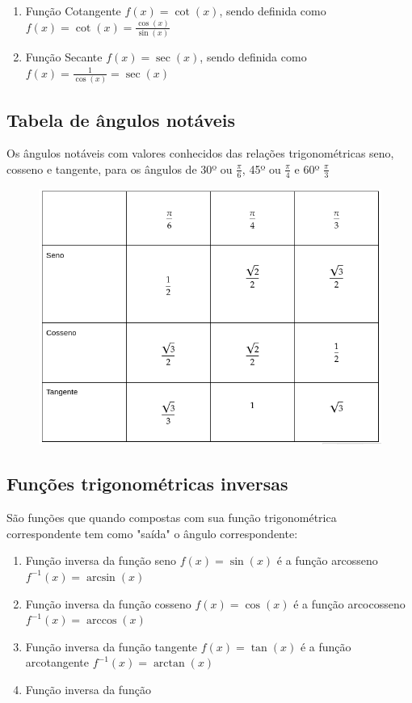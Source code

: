 \begin{multicols*}{2}
\begin{enumerate}[wide, labelwidth=!, labelindent=0pt]
        \item Função Cotangente $f(x) = \cot(x)$, sendo definida como
              $f(x) = \cot(x) = \frac{\cos(x)}{\sin(x)}$

        \item Função Secante $f(x) = \sec(x)$, sendo definida como
              $f(x) = \frac{1}{\cos(x)} = \sec(x)$

    \end{enumerate}
    \subsection*{Tabela de ângulos notáveis}
    Os ângulos notáveis com valores conhecidos das relações trigonométricas seno, cosseno e tangente, para os ângulos de 30º ou $\frac{\pi}{6}$, 45º ou $\frac{\pi}{4}$ e 60º $\frac{\pi}{3}$
    \begin{figure}[H]
        \centering
        \includegraphics[width=\columnwidth]{assets/rafael/img36.png}
    \end{figure}

    \subsection*{Funções trigonométricas inversas}

    São funções que quando compostas com sua função trigonométrica correspondente tem como "saída" o ângulo correspondente:
    \begin{enumerate}
        \item Função inversa da função seno $f(x) = \sin(x)$ é a função arcosseno $f^{-1}(x) = \arcsin(x)$
        \item Função inversa da função cosseno $f(x) = \cos(x)$ é a função arcocosseno
              $f^{-1}(x) = \arccos(x)$
        \item Função inversa da função tangente $f(x) = \tan(x)$ é a função arcotangente
              $f^{-1}(x) = \arctan(x)$
        \item Função inversa da função
    \end{enumerate}


\end{multicols*}
